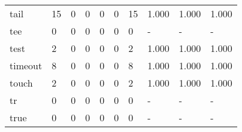 \begin{longtable}{lp{2.0cm}p{2.0cm}p{2.0cm}p{2.0cm}p{2.0cm}p{2.0cm}p{2.0cm}p{2.0cm}p{2.0cm}}
tail      &                     15 &                                  0 &                                 0 &                                0 &                                 0 &                              15 &                                1.000 &                                  1.000 &                                1.000 \\
tee       &                      0 &                                  0 &                                 0 &                                0 &                                 0 &                               0 &                                    - &                                      - &                                    - \\
test      &                      2 &                                  0 &                                 0 &                                0 &                                 0 &                               2 &                                1.000 &                                  1.000 &                                1.000 \\
timeout   &                      8 &                                  0 &                                 0 &                                0 &                                 0 &                               8 &                                1.000 &                                  1.000 &                                1.000 \\
touch     &                      2 &                                  0 &                                 0 &                                0 &                                 0 &                               2 &                                1.000 &                                  1.000 &                                1.000 \\
tr        &                      0 &                                  0 &                                 0 &                                0 &                                 0 &                               0 &                                    - &                                      - &                                    - \\
true      &                      0 &                                  0 &                                 0 &                                0 &                                 0 &                               0 &                                    - &                                      - &                                    - \\

\end{longtable}
